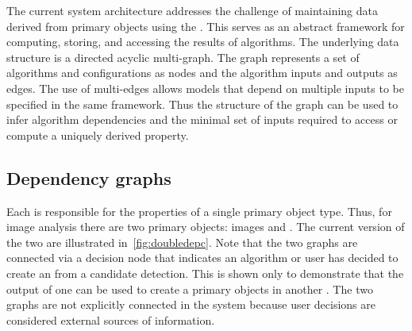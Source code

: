     The current system architecture addresses the challenge of maintaining
      data derived from primary objects using the \depcache{}.
    This serves as an abstract framework for computing, storing, and accessing
      the results of algorithms.
    The underlying data structure is a directed acyclic multi-graph.
    The graph represents a set of algorithms and configurations as nodes and
      the algorithm inputs and outputs as edges.
    The use of multi-edges allows models that depend on multiple inputs to be
      specified in the same framework.
    Thus the structure of the graph can be used to infer algorithm
      dependencies and the minimal set of inputs required to access or compute a
      uniquely derived property.


    \subsection{Dependency graphs}
    Each \depcache{} is responsible for the properties of a single primary
      object type.
    Thus, for \IBEIS{} image analysis there are two primary objects:
    images and \annots{}.
    The current version of the two \depcaches{} are illustrated
      in~\cref{fig:doubledepc}.
    Note that the two graphs are connected via a decision node that indicates
      an algorithm or user has decided to create an \annot{} from a candidate
      detection.
    This is shown only to demonstrate that the output of one \depcache{} can
      be used to create a primary objects in another \depcache{}.
    The two graphs are not explicitly connected in the system because user
      decisions are considered external sources of information.

    \doubledepc{}

